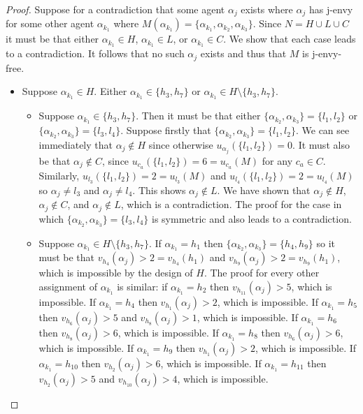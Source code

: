 \begin{proof}
Suppose for a contradiction that some agent $\alpha_j$ exists where $\alpha_j$ has j-envy for some other agent $\alpha_{k_1}$ where $M(\alpha_{k_1}) = \{ \alpha_{k_1}, \alpha_{k_2}, \alpha_{k_3} \}$. Since $N = H \cup L \cup C$ it must be that either $\alpha_{k_1} \in H$, $\alpha_{k_1} \in L$, or $\alpha_{k_1} \in C$. We show that each case leads to a contradiction. It follows that no such $\alpha_j$ exists and thus that $M$ is j-envy-free.
\begin{itemize}
    \item Suppose $\alpha_{k_1} \in H$. Either $\alpha_{k_1} \in \{ h_3, h_7 \}$ or $\alpha_{k_1} \in H \setminus \{ h_3, h_7 \}$.
    \begin{itemize}
        \item Suppose $\alpha_{k_1} \in \{ h_3, h_7 \}$. Then it must be that either $\{ \alpha_{k_2}, \alpha_{k_3} \} = \{ l_1, l_2 \}$ or $\{ \alpha_{k_2}, \alpha_{k_3} \} = \{ l_3, l_4 \}$. Suppose firstly that $\{ \alpha_{k_2}, \alpha_{k_3} \} = \{ l_1, l_2 \}$. We can see immediately that $\alpha_j \notin H$ since otherwise $u_{\alpha_j}(\{ l_1, l_2 \}) = 0$. It must also be that $\alpha_j \notin C$, since  $u_{c_{a}}(\{ l_1, l_2 \}) = 6 = u_{c_a}(M)$ for any $c_a \in C$. Similarly, $u_{l_3}(\{ l_1, l_2 \}) = 2 = u_{l_3}(M)$ and $u_{l_4}(\{ l_1, l_2 \}) = 2 = u_{l_4}(M)$ so $\alpha_j \neq l_3$ and $\alpha_j \neq l_4$. This shows $\alpha_j \notin L$. We have shown that $\alpha_j \notin H$, $\alpha_j \notin C$, and $\alpha_j \notin L$, which is a contradiction. The proof for the case in which $\{ \alpha_{k_2}, \alpha_{k_3} \} = \{ l_3, l_4 \}$ is symmetric and also leads to a contradiction.
        \item Suppose $\alpha_{k_1} \in H\setminus \{ h_3, h_7 \}$. If $\alpha_{k_1} = h_1$ then $\{ \alpha_{k_2}, \alpha_{k_3} \} = \{ h_4, h_9 \}$ so it must be that $v_{h_4}(\alpha_j) > 2 = v_{h_4}(h_1)$ and $v_{h_9}(\alpha_j) > 2 = v_{h_9}(h_1)$, which is impossible by the design of $H$. The proof for every other assignment of $\alpha_{k_1}$ is similar: if $\alpha_{k_1} = h_2$ then $v_{h_{11}}(\alpha_j) > 5$, which is impossible. If $\alpha_{k_1} = h_4$ then $v_{h_1}(\alpha_j) > 2$, which is impossible. If $\alpha_{k_1} = h_5$ then $v_{h_6}(\alpha_j) > 5$ and $v_{h_8}(\alpha_j) > 1$, which is impossible. If $\alpha_{k_1} = h_6$ then $v_{h_8}(\alpha_j) > 6$, which is impossible. If $\alpha_{k_1} = h_8$ then $v_{h_6}(\alpha_j) > 6$, which is impossible. If $\alpha_{k_1} = h_9$ then $v_{h_1}(\alpha_j) > 2$, which is impossible. If $\alpha_{k_1} = h_{10}$ then $v_{h_2}(\alpha_j) > 6$, which is impossible. If $\alpha_{k_1} = h_{11}$ then $v_{h_2}(\alpha_j) > 5$ and $v_{h_{10}}(\alpha_j) > 4$, which is impossible.

\end{itemize}
\end{itemize}
\end{proof}
